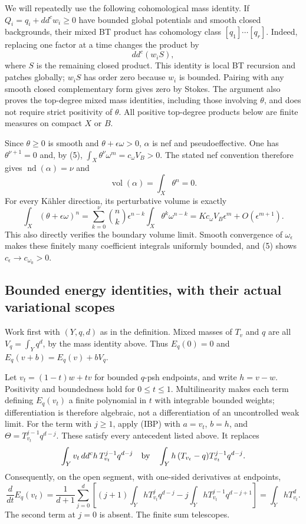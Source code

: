 \documentclass[
  11pt,
]{article}
\begin{document}
We will repeatedly use the following cohomological mass identity. If
\(Q_i=q_i+dd^cw_i\geq0\) have bounded global potentials and smooth
closed backgrounds, their mixed BT product has cohomology class
\([q_1]\cdots[q_r]\). Indeed, replacing one factor at a time changes the
product by \[dd^c(w_i S),\] where \(S\) is the remaining closed product.
This identity is local BT recursion and patches globally; \(w_iS\) has
order zero because \(w_i\) is bounded. Pairing with any smooth closed
complementary form gives zero by Stokes. The argument also proves the
top-degree mixed mass identities, including those involving \(\theta\),
and does not require strict positivity of \(\theta\). All positive
top-degree products below are finite measures on compact \(X\) or \(B\).

Since \(\theta\geq0\) is smooth and \(\theta+\epsilon\omega>0\),
\(\alpha\) is nef and pseudoeffective. One has \(\theta^{\nu+1}=0\) and,
by (5), \(\int_X\theta^\nu\omega^m=c_\omega V_B>0\). The stated nef
convention therefore gives \(\operatorname{nd}(\alpha)=\nu\) and
\[\operatorname{vol}(\alpha)=\int_X\theta^n=0.\] For every Kähler
direction, its perturbative volume is exactly
\[\int_X(\theta+\epsilon\omega)^n
=\sum_{k=0}^\nu\binom nk\epsilon^{n-k}\int_X\theta^k\omega^{n-k}
=Kc_\omega V_B\epsilon^m+O(\epsilon^{m+1}). \tag{8}\] This also directly
verifies the boundary volume limit. Smooth convergence of
\(\omega_\epsilon\) makes these finitely many coefficient integrals
uniformly bounded, and (5) shows \(c_\epsilon\to c_{\omega_0}>0\).

\subsection{Bounded energy identities, with their actual variational
scopes}\label{bounded-energy-identities-with-their-actual-variational-scopes}

Work first with \((Y,q,d)\) as in the definition. Mixed masses of
\(T_v\) and \(q\) are all \(V_q=\int_Yq^d\), by the mass identity above.
Thus \(E_q(0)=0\) and \(E_q(v+b)=E_q(v)+bV_q\).

Let \(v_t=(1-t)w+tv\) for bounded \(q\)-psh endpoints, and write
\(h=v-w\). Positivity and boundedness hold for \(0\leq t\leq1\).
Multilinearity makes each term defining \(E_q(v_t)\) a finite polynomial
in \(t\) with integrable bounded weights; differentiation is therefore
algebraic, not a differentiation of an uncontrolled weak limit. For the
term with \(j\geq1\), apply (IBP) with \(a=v_t\), \(b=h\), and
\(\Theta=T_{v_t}^{j-1}q^{d-j}\). These satisfy every antecedent listed
above. It replaces \[\int_Y v_t\,dd^ch\,T_{v_t}^{j-1}q^{d-j}
\quad\hbox{by}\quad
\int_Y h\,(T_{v_t}-q)T_{v_t}^{j-1}q^{d-j}.\] Consequently, on the open
segment, with one-sided derivatives at endpoints, \[\frac{d}{dt}E_q(v_t)
=\frac1{d+1}\sum_{j=0}^d\left[(j+1)\int_YhT_{v_t}^jq^{d-j}
-j\int_YhT_{v_t}^{j-1}q^{d-j+1}\right]
=\int_YhT_{v_t}^d. \tag{9}\] The second term at \(j=0\) is absent. The
finite sum telescopes.
\end{document}
